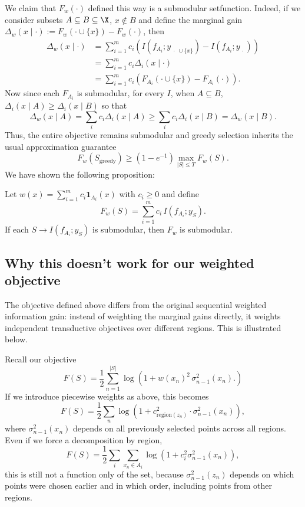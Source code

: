We claim that $F_w(\cdot)$ defined this way is a submodular setfunction. Indeed, if we consider subsets $A \subseteq B \subseteq \X$, $x \notin B$ and define the marginal gain $\Delta_w(x \mid \cdot) := F_w(\cdot \cup \{x\}) - F_w(\cdot)$, then
\begin{align*}
    \Delta_w(x \mid \cdot) &= \sum_{i=1}^m c_i \left( I(f_{A_i}; y_{\; \cdot \; \cup \{x\}}) - I(f_{A_i}; y_{\; \cdot \;}) \right) \\
    &= \sum_{i=1}^m c_i \Delta_i(x \mid \cdot) \\
    &= \sum_{i=1}^m c_i \left(F_{A_i}(\cdot \cup \{x\}) - F_{A_i}(\cdot)\right).
\end{align*}
Now since each $F_{A_i}$ is submodular, for every $I$, when $A\subseteq B$, $\Delta_i(x \mid A) \geq \Delta_i(x \mid B)$ so that 
\begin{equation*}
    \Delta_w(x \mid A) = \sum_i c_i \Delta_i(x \mid A) \geq \sum_i c_i \Delta_i(x \mid B) = \Delta_w(x \mid B).
\end{equation*}
Thus, the entire objective remains submodular and greedy selection inherits the usual approximation guarantee
\begin{equation*}
F_w(S_{\mathrm{greedy}})
\geq
(1-e^{-1})
\max_{|S|\leq T}
F_w(S).
\end{equation*}
We have shown the following proposition:
\begin{proposition} \label{prop: submodularobj}
    Let $w(x)=\sum_{i=1}^m c_i\mathbf{1}_{A_i}(x)$ with $c_i \geq 0$ and define 
    $$F_w(S)=
    \sum_{i=1}^m
    c_i\,I(f_{A_i};y_S).$$ 
    If each $S \to I(f_{A_i}; y_S)$ is submodular, then $F_w$ is submodular.
\end{proposition}

\subsection{Why this doesn't work for our weighted objective}
The objective defined above differs from the original sequential weighted information gain: instead of weighting the marginal gains directly, it weights independent transductive objectives over different regions. This is illustrated below.

Recall our objective
\begin{equation*}
F(S)
= \frac{1}{2}
\sum_{n=1}^{|S|}
\log\!\left(
1+w(x_n)^2\,\sigma_{n-1}^2(x_n).
\right)
\end{equation*}
If we introduce piecewise weights as above, this becomes
\begin{equation*}
F(S)
= \frac{1}{2}
\sum_n
\log\!\left(
1+c_{\mathrm{region}(z_n)}^2
\cdot
\sigma_{n-1}^2(x_n)
\right),
\end{equation*}
where $\sigma_{n-1}^2(x_n)$
depends on all previously selected points across all regions.
Even if we force a decomposition by region,
\begin{equation*}
F(S)
= \frac{1}{2}
\sum_i
\sum_{x_n \in A_i}
\log\!\left(
1+c_i^2
\sigma_{n-1}^2(x_n)
\right),
\end{equation*}
this is still not a function only of the set, because
$\sigma_{n-1}^2(z_n)$
depends on which points were chosen earlier and in which order, including points from other regions.

